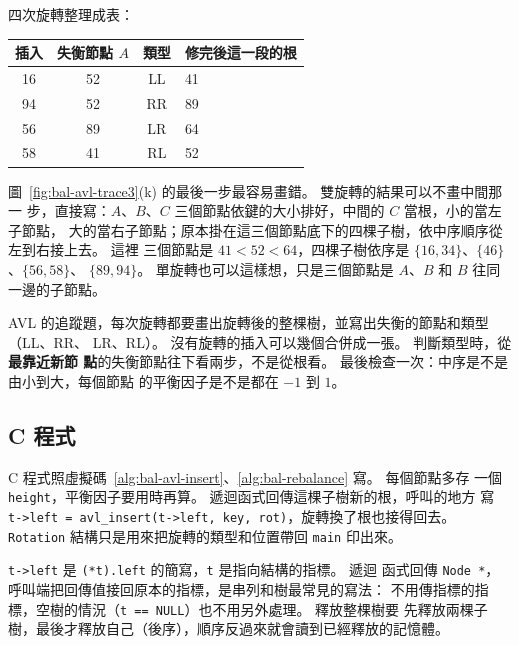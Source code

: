 四次旋轉整理成表：
\par\nopagebreak
\begin{center}
\begin{tabular}{cccl}
\toprule
插入 & 失衡節點 $A$ & 類型 & 修完後這一段的根 \\
\midrule
16 & 52 & LL & 41 \\
94 & 52 & RR & 89 \\
56 & 89 & LR & 64 \\
58 & 41 & RL & 52 \\
\bottomrule
\end{tabular}
\end{center}

圖~\ref{fig:bal-avl-trace3}(k) 的最後一步最容易畫錯。 雙旋轉的結果可以不畫中間那一
步，直接寫：$A$、$B$、$C$ 三個節點依鍵的大小排好，中間的 $C$ 當根，小的當左子節點，
大的當右子節點；原本掛在這三個節點底下的四棵子樹，依中序順序從左到右接上去。 這裡
三個節點是 $41 < 52 < 64$，四棵子樹依序是 $\{16, 34\}$、$\{46\}$、$\{56, 58\}$、
$\{89, 94\}$。 單旋轉也可以這樣想，只是三個節點是 $A$、$B$ 和 $B$ 往同一邊的子節點。

\begin{examnote}
AVL 的追蹤題，每次旋轉都要畫出旋轉後的整棵樹，並寫出失衡的節點和類型（LL、RR、
LR、RL）。 沒有旋轉的插入可以幾個合併成一張。 判斷類型時，從\textbf{最靠近新節
點}的失衡節點往下看兩步，不是從根看。 最後檢查一次：中序是不是由小到大，每個節點
的平衡因子是不是都在 $-1$ 到 $1$。
\end{examnote}

\subsection{C 程式}
\label{sec:bal-avl-c}

C 程式照虛擬碼~\ref{alg:bal-avl-insert}、\ref{alg:bal-rebalance} 寫。 每個節點多存
一個 \texttt{height}，平衡因子要用時再算。 遞迴函式回傳這棵子樹新的根，呼叫的地方
寫 \texttt{t->left = avl\_insert(t->left, key, rot)}，旋轉換了根也接得回去。
\texttt{Rotation} 結構只是用來把旋轉的類型和位置帶回 \texttt{main} 印出來。

\begin{cbookrecap}[第~14~章 14.5 節、第~15~章、第~19~章 19.10、19.15、19.17 節]
\texttt{t->left} 是 \texttt{(*t).left} 的簡寫，\texttt{t} 是指向結構的指標。 遞迴
函式回傳 \texttt{Node *}，呼叫端把回傳值接回原本的指標，是串列和樹最常見的寫法：
不用傳指標的指標，空樹的情況（\texttt{t == NULL}）也不用另外處理。 釋放整棵樹要
先釋放兩棵子樹，最後才釋放自己（後序），順序反過來就會讀到已經釋放的記憶體。
\end{cbookrecap}

